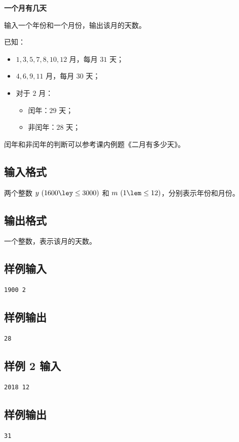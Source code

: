 \documentclass{article}
\newcommand{\problemname}[1]{\begin{center}\Large\bfseries #1\end{center}}
\begin{document}
\problemname{一个月有几天}

输入一个年份和一个月份，输出该月的天数。

已知：

\begin{itemize}
  \item $1,3,5,7,8,10,12$ 月，每月 $31$ 天；

  \item $4,6,9,11$ 月，每月 $30$ 天；

  \item 对于 $2$ 月：

\begin{itemize}
  \item 闰年：$29$ 天；

  \item 非闰年：$28$ 天；

\end{itemize}
\end{itemize}
闰年和非闰年的判断可以参考课内例题《二月有多少天》。

\subsection*{输入格式}
两个整数 $y\text{ }(1600\ley\le3000)$ 和 $m\text{ }(1\lem\le12)$，分别表示年份和月份。

\subsection*{输出格式}
一个整数，表示该月的天数。

\subsection*{样例输入}
\begin{verbatim}
1900 2
\end{verbatim}

\subsection*{样例输出}
\begin{verbatim}
28
\end{verbatim}

\subsection*{样例 2 输入}
\begin{verbatim}
2018 12
\end{verbatim}

\subsection*{样例输出}
\begin{verbatim}
31
\end{verbatim}
\end{document}
